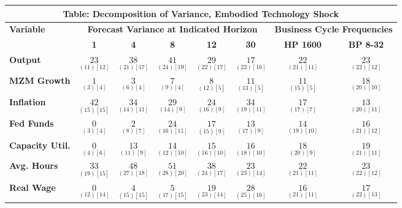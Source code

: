 \documentclass{article}
\begin{document}
 
 \begin{tabular}{|l|c|@{}c|c|@{}c|c|@{}c|c|} 
 \hline 
 \multicolumn{8}{|c|}{\textbf{Table: Decomposition of Variance, Embodied Technology Shock}} \\ \hline 
 \textbf{Variable} & \multicolumn{5}{|c}{\textbf{Forecast Variance at 
 Indicated Horizon}} & \multicolumn{2}{|c|}{\textbf{Business Cycle 
 Frequencies}} \\ \cline{2-8} 
 & \textbf{1} & \textbf{4} & \textbf{8} & \textbf{12} & \textbf{30} & \textbf{%
 HP 1600} & \textbf{BP 8-32} \\ \hline\hline 
 \textbf{Output} & $\underset{( 11) [ 12]}{ 23}$ & $\underset{( 21) [ 17]}{ 38}$ & $\underset{( 24) [ 19]}{ 41}$ & $\underset{( 22) [ 17]}{ 29}$ & $\underset{( 22) [ 16]}{ 17}$ & $\underset{( 21) [ 11]}{ 22}$ & $\underset{( 22) [ 12]}{ 23}$ \\ \hline 
 \textbf{MZM Growth} & $\underset{(  3) [  4]}{  1}$ & $\underset{(  6) [  4]}{  3}$ & $\underset{(  9) [  4]}{  7}$ & $\underset{( 12) [  5]}{  8}$ & $\underset{( 13) [  5]}{ 11}$ & $\underset{( 15) [  5]}{ 11}$ & $\underset{( 20) [ 10]}{ 18}$ \\ \hline 
 \textbf{Inflation} & $\underset{( 15) [ 15]}{ 42}$ & $\underset{( 14) [ 11]}{ 34}$ & $\underset{( 14) [  9]}{ 29}$ & $\underset{( 16) [  9]}{ 24}$ & $\underset{( 19) [ 11]}{ 34}$ & $\underset{( 17) [  7]}{ 17}$ & $\underset{( 20) [ 11]}{ 13}$ \\ \hline 
 \textbf{Fed Funds} & $\underset{(  3) [  4]}{  0}$ & $\underset{(  8) [  7]}{  2}$ & $\underset{( 16) [ 11]}{ 24}$ & $\underset{( 15) [  9]}{ 17}$ & $\underset{( 17) [  9]}{ 13}$ & $\underset{( 19) [ 10]}{ 14}$ & $\underset{( 21) [ 12]}{ 16}$ \\ \hline 
 \textbf{Capacity Util.} & $\underset{(  4) [  6]}{  0}$ & $\underset{( 11) [  9]}{ 13}$ & $\underset{( 12) [ 10]}{ 14}$ & $\underset{( 16) [ 10]}{ 15}$ & $\underset{( 18) [ 10]}{ 16}$ & $\underset{( 20) [  9]}{ 18}$ & $\underset{( 21) [ 11]}{ 19}$ \\ \hline 
 \textbf{Avg. Hours} & $\underset{( 19) [ 15]}{ 33}$ & $\underset{( 27) [ 18]}{ 48}$ & $\underset{( 28) [ 20]}{ 51}$ & $\underset{( 24) [ 17]}{ 38}$ & $\underset{( 23) [ 14]}{ 23}$ & $\underset{( 21) [ 11]}{ 22}$ & $\underset{( 22) [ 12]}{ 23}$ \\ \hline 
 \textbf{Real Wage} &  $\underset{( 12) [ 14]}{  0}$ & $\underset{( 15) [ 15]}{  4}$ & $\underset{( 17) [ 15]}{  5}$ & $\underset{( 23) [ 14]}{ 19}$ & $\underset{( 25) [ 16]}{ 28}$ & $\underset{( 21) [ 11]}{ 16}$ & $\underset{( 22) [ 13]}{ 17}$ \\ \hline 

\end{tabular}
\end{document}
